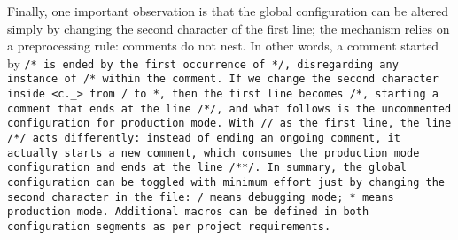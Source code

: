 Finally, one important observation is that the global configuration can
be altered simply by changing the second character of the first line;
the mechanism relies on a preprocessing rule: comments do not nest.
In other words, a comment started by \tt{/*} is ended by the first occurrence
of \tt{*/}, disregarding any instance of \tt{/*} within the comment.
If we change the second character inside \tt{<c._>} from \tt{/} to \tt{*},
then the first line becomes \tt{/*},
starting a comment that ends at the line \tt{/*/},
and what follows is the uncommented configuration for production mode.
With \tt{//} as the first line, the line \tt{/*/} acts differently:
instead of ending an ongoing comment, it actually starts a new comment,
which consumes the production mode configuration and ends at the line \tt{/**/}.
In summary, the global configuration can be toggled with
minimum effort just by changing the second character in the file:
\tt{/} means debugging mode; \tt{*} means production mode.
Additional macros can be defined in both
configuration segments as per project requirements.
